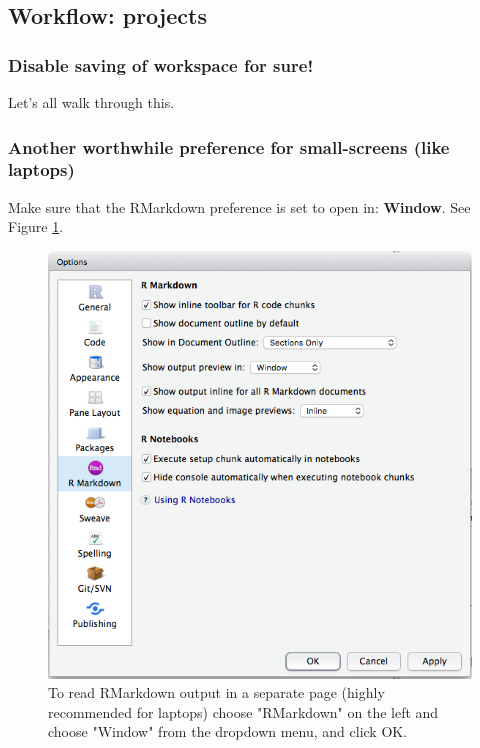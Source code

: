\documentclass[]{book}
\theoremstyle{definition}
\theoremstyle{definition}
\theoremstyle{remark}
\begin{document}
\subsection{Workflow: projects}\label{workflow-projects}

\subsubsection{Disable saving of workspace for
sure!}\label{disable-saving-of-workspace-for-sure}

Let's all walk through this.

\subsubsection{Another worthwhile preference for small-screens (like
laptops)}\label{another-worthwhile-preference-for-small-screens-like-laptops}

Make sure that the RMarkdown preference is set to open in:
\textbf{Window}. See Figure \ref{fig:rmd-window}.

\begin{figure}

{\centering \includegraphics[width=0.9\linewidth]{images/rmd_window} 

}

\caption{To read RMarkdown output in a separate page (highly recommended for laptops) choose "RMarkdown" on the left and choose "Window" from the dropdown menu, and click OK.}\label{fig:rmd-window}
\end{figure}
\end{document}
